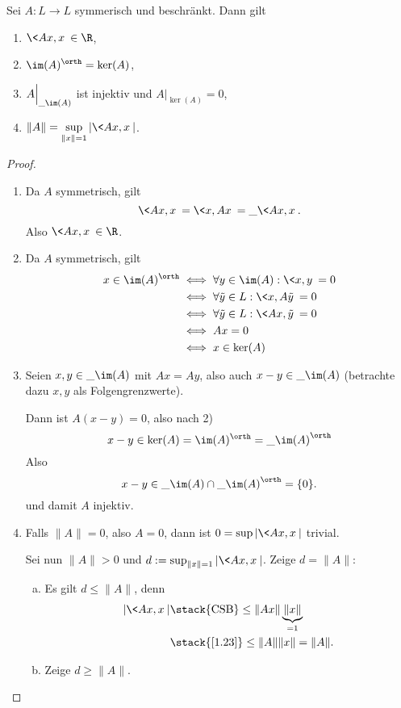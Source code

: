 \begin{st} \label{3.3}
	Sei $A: L \to L$ symmerisch und beschränkt.
	Dann gilt
	\begin{enumerate}[1)]
		\item
			$\displaystyle \<Ax,x\> \in \R$,
		\item
			$\displaystyle \im(A)^\orth = \ker(A)$,
		\item
			$\displaystyle A \Big|_{\_{\im (A)} }$ ist injektiv und $A \Big|_{\ker(A)} = 0$,
		\item
			$\displaystyle \|A\| = \sup_{\|x\|=1} |\<Ax,x\>|$.
	\end{enumerate}
	\begin{proof}
		\begin{enumerate}[1)]
			\item
				Da $A$ symmetrisch, gilt
				\[
					\<Ax, x\> = \<x, Ax\> = \_{\<Ax,x\>}.
				\]
				Also $\<Ax, x\> \in \R$.
			\item
				Da $A$ symmetrisch, gilt
				\begin{align*}
					x \in \im(A)^\orth
					& \iff \forall y \in \im(A) : \<x,y\> = 0 \\
					& \iff \forall \tilde y \in L: \<x, A\tilde y\> = 0 \\
					& \iff \forall \tilde y \in L: \<Ax,\tilde y\> = 0 \\
					& \iff Ax = 0 \\
					& \iff x \in \ker(A)
				\end{align*}
			\item
				Seien $x,y \in \_{\im(A)}$ mit $Ax = Ay$, also auch $x-y \in \_{\im(A)}$ (betrachte dazu $x,y$ als Folgengrenzwerte).

				Dann ist $A(x-y) = 0$, also nach 2)
				\[
					x-y \in \ker (A) = \im(A)^\orth = \_{\im(A)}^\orth
				\]
				Also 
				\[
					x-y \in \_{\im(A)} \cap \_{\im(A)}^\orth = \{0\}.
				\]
				und damit $A$ injektiv.
			\item
				Falls $\|A\| = 0$, also $A=0$, dann ist $0 = \sup |\<Ax,x\>|$ trivial.

				Sei nun $\|A\| > 0$ und $d := \sup_{\|x\|=1} |\<Ax,x\>|$.
				Zeige $d = \|A\|$:
				\begin{enumerate}[a)]
					\item
						Es gilt $d \le \|A\|$, denn
						\begin{align*}
							|\<Ax,x\>| 
							&\stack{\text{CSB}} \le \|Ax\| \underbrace{\|x\|}_{=1} \\
							&\stack{\ref{1.23}}\le \|A\| \|x\|
							= \|A\|.
						\end{align*}
					\item
						Zeige $d \ge \|A\|$.


\end{enumerate}
\end{enumerate}
\end{proof}
\end{st}
